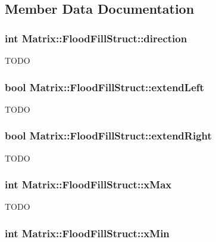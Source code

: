 \subsection{Member Data Documentation}
\hypertarget{structMatrix_1_1FloodFillStruct_ac2032c72860e9fa52c78bf95656a2811}{
\subsubsection[{direction}]{\setlength{\rightskip}{0pt plus 5cm}int {\bf Matrix::FloodFillStruct::direction}}}
\label{structMatrix_1_1FloodFillStruct_ac2032c72860e9fa52c78bf95656a2811}
TODO \hypertarget{structMatrix_1_1FloodFillStruct_a016d54b419c9795dad0963fde6ca265c}{
\subsubsection[{extendLeft}]{\setlength{\rightskip}{0pt plus 5cm}bool {\bf Matrix::FloodFillStruct::extendLeft}}}
\label{structMatrix_1_1FloodFillStruct_a016d54b419c9795dad0963fde6ca265c}
TODO \hypertarget{structMatrix_1_1FloodFillStruct_a21709c60c2ce857ba0d589cb61c3ac40}{
\subsubsection[{extendRight}]{\setlength{\rightskip}{0pt plus 5cm}bool {\bf Matrix::FloodFillStruct::extendRight}}}
\label{structMatrix_1_1FloodFillStruct_a21709c60c2ce857ba0d589cb61c3ac40}
TODO \hypertarget{structMatrix_1_1FloodFillStruct_aa43e2397f58d8185c7a144aa08da5fa7}{
\subsubsection[{xMax}]{\setlength{\rightskip}{0pt plus 5cm}int {\bf Matrix::FloodFillStruct::xMax}}}
\label{structMatrix_1_1FloodFillStruct_aa43e2397f58d8185c7a144aa08da5fa7}
TODO \hypertarget{structMatrix_1_1FloodFillStruct_a1fdc18f462079d7272674bcd17a59a1c}{
\subsubsection[{xMin}]{\setlength{\rightskip}{0pt plus 5cm}int {\bf Matrix::FloodFillStruct::xMin}}}
